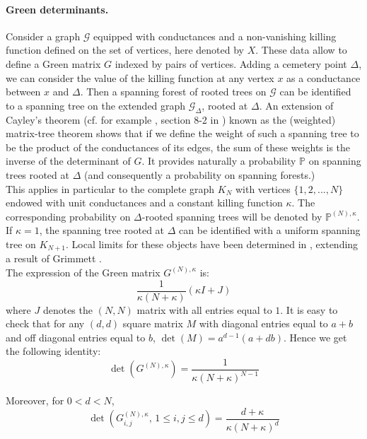 \documentclass[11pt]{article}
\begin{document}
\paragraph{Green determinants.}
 Consider a graph $\mathcal G$ equipped with conductances  and a non-vanishing killing function defined on the set of vertices, here denoted by $X$. These data allow to define a Green matrix $G $ indexed by  pairs of vertices. Adding a cemetery point   $\Delta$, we can consider the value of the killing function at any vertex $x$ as a conductance between $x$ and $\Delta$. Then a spanning forest of rooted trees on $\mathcal G$ can be identified to a spanning tree on the extended graph $\mathcal G_{\Delta}$, rooted at $\Delta$.   An extension of Cayley's theorem (cf. for example \cite{stfl}, section 8-2 in \cite{book}) known as the (weighted) matrix-tree theorem shows that if we define the weight of such a spanning tree to be the product of the conductances of its edges, the sum of these weights is the inverse of the determinant of $G$. It provides  naturally a probability $\mathbb P$ on spanning trees rooted at $\Delta$ (and consequently a probability on spanning forests.) \\
  This applies in particular to the complete graph $K_N$ with vertices $\{1,2,...,N\}$ endowed with unit conductances and a constant killing function $\kappa$.
 The corresponding probability 
  on $\Delta$-rooted spanning trees will be denoted by $\mathbb P^{(N),\kappa}$. If $\kappa=1$, the spanning tree rooted at $\Delta$ can be identified with a uniform spanning tree on $K_{N+1}$. Local limits for these objects have been determined in \cite{dnm}, extending a result of Grimmett \cite{Grim}. \\

 The expression of the Green matrix $G^{(N),\kappa}$ is:
\[
\frac{1}{\kappa (N+\kappa)}(\kappa I+J)
\]
where $J$ denotes the $(N,N)$ matrix with all entries equal to $1$. 
It is easy to check that for any $(d,d)$  square matrix $M$ with diagonal entries equal to $a+b$ and off diagonal entries equal to $b$, $\det(M)=a^{d-1}(a+db)$. 
Hence we get the following identity:
 \begin{equation}
\det(G^{(N),\kappa})=\frac{1}{\kappa (N+\kappa)^{N-1}}
 \end{equation}
 
 Moreover, for $0<d<N$,
  \begin{equation}\label{lemdet}
\det(G^{(N),\kappa}_{i,j},\, 1\leq i,j\leq d)= \frac{d+\kappa}{\kappa(N+\kappa)^d}
 \end{equation}
\end{document}

